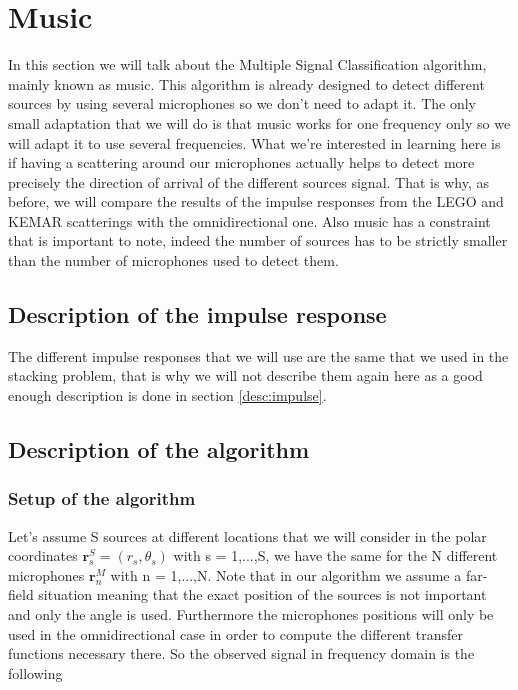 \section{Music}

In this section we will talk about the Multiple Signal Classification algorithm, mainly known as music. This algorithm is already designed to detect different sources by using several microphones so we don't need to adapt it. The only small adaptation that we will do is that music works for one frequency only so we will adapt it to use several frequencies. What we're interested in learning here is if having a scattering around our microphones actually helps to detect more precisely the direction of arrival of the different sources signal. That is why, as before, we will compare the results of the impulse responses from the LEGO and KEMAR scatterings with the omnidirectional one. Also music has a constraint that is important to note, indeed the number of sources has to be strictly smaller than the number of microphones used to detect them. 


\subsection{Description of the impulse response}

The different impulse responses that we will use are the same that we used in the stacking problem, that is why we will not describe them again here as a good enough description is done in section \ref{desc:impulse}.


\subsection{Description of the algorithm }

\subsubsection{Setup of the algorithm}

Let's assume S sources at different locations that we will consider in the polar coordinates $\boldsymbol r^S_s = (r_s, \theta _s)$ with s = 1,...,S, we have the same for the N different microphones $\boldsymbol r^M_n $ with n = 1,...,N. Note that in our algorithm we assume a far-field situation meaning that the exact position of the sources is not important and only the angle is used. Furthermore the microphones positions will only be used in the omnidirectional case in order to compute the different transfer functions necessary there. So the observed signal in frequency domain is the following

